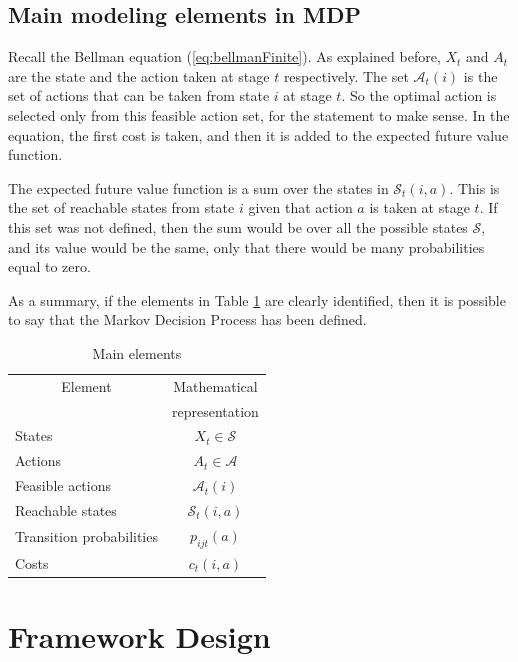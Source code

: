 \documentclass[11pt]{article}
\begin{document}
\subsection{Main modeling elements in MDP}

Recall the Bellman equation (\ref{eq:bellmanFinite}). As explained before, $X_t$ and $A_t$ are the state and the action taken at stage $t$ respectively. The set $\mathcal{A}_t(i)$ is the set of actions that can be taken from state $i$ at stage $t$. So the optimal action is selected only from this feasible action set, for the statement to make sense. In the equation, the first cost is taken, and then it is added to the expected future value function.

The expected future value function is a sum over the states in $\mathcal{S}_t(i,a)$. This is the set of reachable states from state $i$ given that action $a$ is taken at stage $t$. If this set was not defined, then the sum would be over all the possible states $\mathcal{S}$, and its value would be the same, only that there would be many probabilities equal to zero.

As a summary, if the elements in Table \ref{tb:elems} are clearly identified, then it is possible to say that the Markov Decision Process has been defined.

\begin{table}[ht]
  \centering
  \begin{tabular}{|l|c|}
    \hline
    \multicolumn{1}{|c|}{Element} &  \multicolumn{1}{|c|}{Mathematical} \\
    \multicolumn{1}{|c|}{} &  \multicolumn{1}{|c|}{representation} \\
    \hline
    \hline
      States & $X_t \in \mathcal{S}$ \\
      \hline
      Actions & $A_t \in \mathcal{A}$ \\
      \hline
      Feasible actions & $\mathcal{A}_t(i)$ \\
      \hline
      Reachable states & $\mathcal{S}_t(i,a)$ \\
      \hline
      Transition probabilities & $p_{ijt}(a)$ \\
      \hline
      Costs & $c_t(i,a)$ \\
      \hline
  \end{tabular}\caption{Main elements}\label{tb:elems}
\end{table}


\section{Framework Design}
\label{sec:frame}
\end{document}
